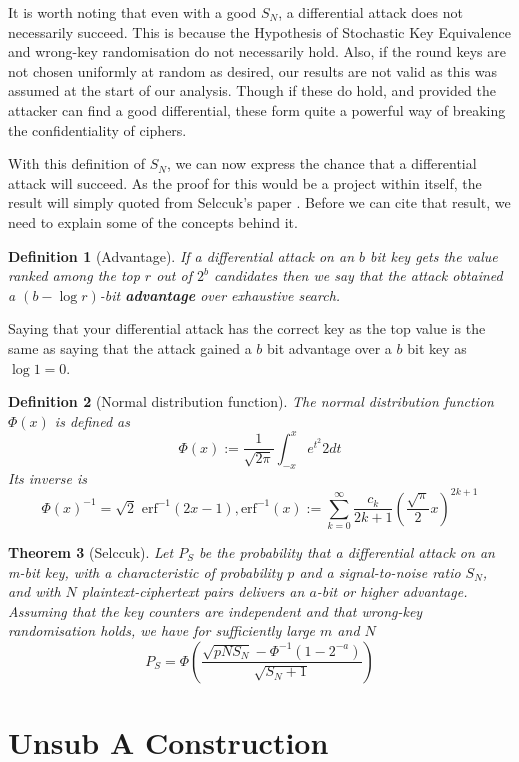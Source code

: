 \documentclass[12pt,a4paper]{article}
\newtheorem{theorem}{Theorem}
\newtheorem{definition}[theorem]{Definition}
\begin{document}
It is worth noting that even with a good $S_N$, a differential attack does
not necessarily succeed. This is because the Hypothesis of Stochastic Key
Equivalence and wrong-key randomisation do not necessarily hold. Also, if the
round keys are not chosen uniformly at random as desired, our results are not
valid as this was assumed at the start of our analysis. Though if these do
hold, and provided the attacker can find a good differential, these form quite
a powerful way of breaking the confidentiality of ciphers.

With this definition of $S_N$, we can now express the chance that a
differential attack will succeed. As the proof for this would be a project
within itself, the result will simply quoted from Selccuk's paper
\cite{selccuk2008probability}. Before we can cite that result, we need to
explain some of the concepts behind it.  

\begin{definition}[Advantage]
If a differential attack on an $b$ bit key gets the value ranked among the top $r$ out of
$2^b$ candidates then we say that the attack obtained a $(b-\log r)$-bit
\textbf{advantage} over exhaustive search.
\end{definition}

Saying that your differential attack has the correct key as the top value is the same as
saying that the attack gained a $b$ bit advantage over a $b$ bit key as $\log 1
= 0$.

\begin{definition}[Normal distribution function]
The normal distribution function $\Phi(x)$ is defined as
\[\Phi(x) := \frac{1}{\sqrt{2 \pi}} \int_{-x}^{x} e^{t^2}{2} dt\]
Its inverse is
\[\Phi(x)^{-1} = \sqrt{2} \mbox{ erf}^{-1}(2x-1), \mbox{erf}^{-1}(x) := \sum_{k=0}^{\infty}
\frac{c_k}{2k+1} \left(\frac{\sqrt{\pi}}{2}x\right)^{2k+1}\]
\end{definition}
\begin{theorem}[Selccuk]
Let $P_S$ be the probability that a differential attack on an m-bit key, with a
characteristic of probability $p$ and a signal-to-noise ratio $S_N$, and with
$N$ plaintext-ciphertext pairs delivers an $a$-bit or higher advantage.
Assuming that the key counters are independent and that wrong-key randomisation
holds, we have for sufficiently large $m$ and $N$ 
\[P_S = \Phi \left( \frac{\sqrt{pN S_N} - \Phi^{-1}(1-2^{-a}) }{\sqrt{S_N +1}}
\right)\]
\end{theorem}

\newpage
\appendix
\newpage
\section{Unsub A Construction}
\label{sec:UnsubA}
\end{document}
